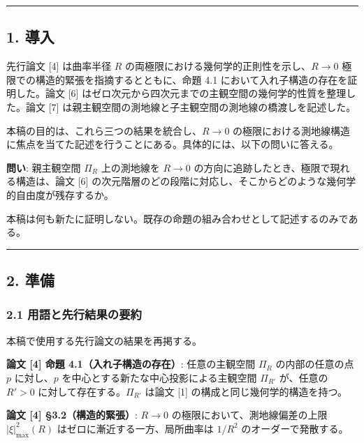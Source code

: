 \documentclass[a4paper,11pt]{ltjsarticle}
\theoremstyle{definition}
\begin{document}
\begin{center}\rule{0.5\linewidth}{0.5pt}\end{center}

\subsection{1. 導入}\label{ux5c0eux5165}

先行論文 {[}4{]} は曲率半径 \(R\)
の両極限における幾何学的正則性を示し、\(R \to 0\)
極限での構造的緊張を指摘するとともに、命題 4.1
において入れ子構造の存在を証明した。論文 {[}6{]}
はゼロ次元から四次元までの主観空間の幾何学的性質を整理した。論文 {[}7{]}
は親主観空間の測地線と子主観空間の測地線の橋渡しを記述した。

本稿の目的は、これら三つの結果を統合し、\(R \to 0\)
の極限における測地線構造に焦点を当てた記述を行うことにある。具体的には、以下の問いに答える。

\textbf{問い}: 親主観空間 \(\Pi_R\) 上の測地線を \(R \to 0\)
の方向に追跡したとき、極限で現れる構造は、論文 {[}6{]}
の次元階層のどの段階に対応し、そこからどのような幾何学的自由度が残存するか。

本稿は何も新たに証明しない。既存の命題の組み合わせとして記述するのみである。

\begin{center}\rule{0.5\linewidth}{0.5pt}\end{center}

\subsection{2. 準備}\label{ux6e96ux5099}

\subsubsection{2.1
用語と先行結果の要約}\label{ux7528ux8a9eux3068ux5148ux884cux7d50ux679cux306eux8981ux7d04}

本稿で使用する先行論文の結果を再掲する。

\textbf{論文 {[}4{]} 命題 4.1（入れ子構造の存在）}: 任意の主観空間
\(\Pi_R\) の内部の任意の点 \(p\) に対し、\(p\)
を中心とする新たな中心投影による主観空間 \(\Pi_{R'}\) が、任意の
\(R' > 0\) に対して存在する。\(\Pi_{R'}\) は論文 {[}1{]}
の構成と同じ幾何学的構造を持つ。

\textbf{論文 {[}4{]} §3.2（構造的緊張）}: \(R \to 0\)
の極限において、測地線偏差の上限 \(|\xi|^2_{\max}(R)\)
はゼロに漸近する一方、局所曲率は \(1/R^2\) のオーダーで発散する。
\end{document}
